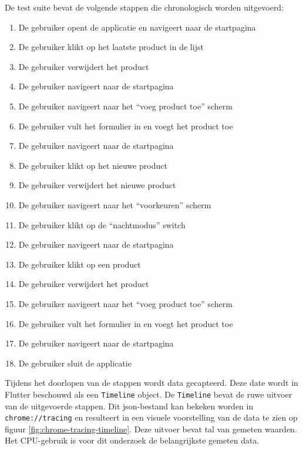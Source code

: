 De test suite bevat de volgende stappen die chronologisch worden uitgevoerd:
\begin{enumerate}
    \item De gebruiker opent de applicatie en navigeert naar de startpagina
    \item De gebruiker klikt op het laatste product in de lijst
    \item De gebruiker verwijdert het product
    \item De gebruiker navigeert naar de startpagina
    \item De gebruiker navigeert naar het ``voeg product toe'' scherm
    \item De gebruiker vult het formulier in en voegt het product toe
    \item De gebruiker navigeert naar de startpagina
    \item De gebruiker klikt op het nieuwe product
    \item De gebruiker verwijdert het nieuwe product
    \item De gebruiker navigeert naar het ``voorkeuren'' scherm
    \item De gebruiker klikt op de ``nachtmodus'' switch
    \item De gebruiker navigeert naar de startpagina
    \item De gebruiker klikt op een product
    \item De gebruiker verwijdert het product
    \item De gebruiker navigeert naar het ``voeg product toe'' scherm
    \item De gebruiker vult het formulier in en voegt het product toe
    \item De gebruiker navigeert naar de startpagina
    \item De gebruiker sluit de applicatie
\end{enumerate}


Tijdens het doorlopen van de stappen wordt data gecapteerd. Deze date wordt in Flutter beschouwd als een \verb|Timeline| object. De \verb|Timeline| bevat de ruwe uitvoer van de uitgevoerde stappen. Dit json-bestand kan bekeken worden in \verb|chrome://tracing| en resulteert in een visuele voorstelling van de data te zien op figuur \ref{fig:chrome-tracing-timeline}. Deze uitvoer bevat tal van gemeten waarden. Het CPU-gebruik is voor dit onderzoek de belangrijkste gemeten data.

